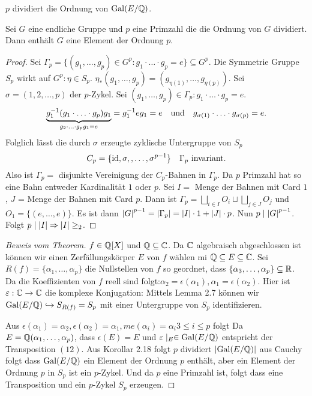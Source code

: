 \begin{corollary}
	$p$ dividiert die Ordnung von $\operatorname{Gal}(E / \mathbb{Q})$.
\end{corollary}

\begin{lemma}[Cauchy]
	Sei $G$ eine endliche Gruppe und $p$ eine Primzahl die die Ordnung von $G$ dividiert.
	Dann enthält $G$ eine Element der Ordnung $p$.
\end{lemma}

\begin{proof}
	Sei $\Gamma_{p} = \{(g_1,\ldots, g_{p}) \in G^{p}: g_1 \cdot \ldots \cdot g_{p} = e\} \subseteq G^{p}$.
	Die Symmetrie Gruppe $S_{p}$ wirkt auf $G^{p}: \eta \in S_{p}$. $\eta_{*}(g_1,\ldots,g_{p}) = (g_{\eta(1)},\ldots,g_{\eta(p)})$.
	Sei $\sigma = (1,2,\ldots,p)$ der $p$-Zykel.
	Sei $(g_1,\ldots,g_{p}) \in \Gamma_{p}: g_1 \cdot \ldots \cdot g_{p} = e$.
	\[
		\underbrace{g_1^{-1} (g_1 \cdot \ldots\cdot g_{p}) g_{1}}_{g_2 \cdot \ldots\cdot g_{p} g_1 = e} = g_1^{-1} e g_1 = e \qq{und} g_{\sigma(1)} \cdot \ldots\cdot g_{\sigma(p)} = e
	.\] 
	Folglich lässt die durch $\sigma$ erzeugte zyklische Untergruppe von $S_{p}$ 
	\[
	C_{p} = \{\operatorname{id}, \sigma, ,\ldots, \sigma^{p-1}\} \quad \Gamma_{p} \text{ invariant}
	.\]
	Also ist $\Gamma_{p} = $ disjunkte Vereinigung der $C_{p}$-Bahnen in $\Gamma_{p}$.
	Da $p$ Primzahl hat so eine Bahn entweder Kardinalität $1 $ oder $p$.
	Sei $I = $ Menge der Bahnen mit Card $1$, $J$ = Menge der Bahnen mit Card $p$.
	Dann ist  $\Gamma_{p} = \bigsqcup_{i \in I} O_{i} \sqcup \bigsqcup_{j \in J} O_{j}$ und $O_1 = \{(e,\ldots,e)\}$.
	Es ist dann $\abs{G}^{p-1} = \abs{\Gamma_{p}} = \abs{I} \cdot 1 + \abs{J} \cdot p$.
	Nun $p \mid \abs{G}^{p-1}$. Folgt $p \mid \abs{I} \Rightarrow \abs{I} \geq_2$.
\end{proof}

\begin{proof}[Beweis vom Theorem]
	$f \in \mathbb{Q}[X]$ und $\mathbb{Q} \subseteq \mathbb{C}$. Da $\mathbb{C}$ algebraisch abgeschlossen ist können wir einen Zerfällungskörper $E$ von $f$ wählen mi $\mathbb{Q} \subseteq E \subseteq \mathbb{C}$.
	Sei $R(f) = \{\alpha_1,\ldots,\alpha_{p}\}$ die Nullstellen von $f$ so geordnet, dass $\{\alpha_3,\ldots,\alpha_{p}\} \subseteq \mathbb{R}$.
	Da die Koeffizienten von $f$ reell sind folgt:$\alpha_2 = \epsilon(\alpha_1), \alpha_1 = \epsilon(\alpha_2)$.
	Hier ist $ \varepsilon: \mathbb{C} \to \mathbb{C}$ die komplexe Konjugation: 
	Mittels Lemma 2.7 können wir $\operatorname{Gal}(E / \mathbb{Q}) \hookrightarrow S_{R(f)} = S_{p}$ mit einer Untergruppe von $S_{p}$ identifizieren.

	Aus $\epsilon(\alpha_1) = \alpha_2, \epsilon(\alpha_2) = \alpha_1, me(\alpha_{i}) = \alpha_{i} 3 \leq i \leq p $ folgt
	Da $E = \mathbb{Q}(\alpha_1,\ldots,\alpha_{p})$, dass $\epsilon(E) = E$ und $\varepsilon \mid_{E} \in \operatorname{Gal}(E / \mathbb{Q})$ entspricht der Transposition $(12)$.
	Aus Korollar 2.18 folgt $p$ dividiert $\abs{\operatorname{Gal}(E / \mathbb{Q})}$ aus Cauchy folgt dass $\operatorname{Gal}(E / \mathbb{Q})$ ein Element der Ordnung $p$ enthält, aber ein Element
	der Ordnung  $p$ in $S_{p}$ ist ein $p$-Zykel. Und da $p$ eine Primzahl ist, folgt dass eine Transposition und ein $p$-Zykel $S_{p}$ erzeugen.
\end{proof}

